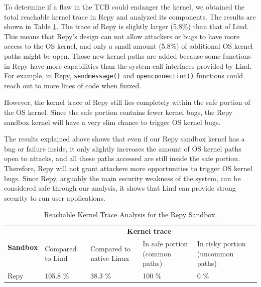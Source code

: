 To determine if a flaw in the TCB could endanger the kernel,
we obtained the total reachable kernel trace in Repy and analyzed its
components.
The results are shown in Table \ref{table:trace-Repy}. The trace of Repy is
slightly larger (5.8\%) than that of Lind.
This means that Repy's design can not allow attackers or bugs to
have more access to the OS kernel, and only a small amount (5.8\%) of
additional OS kernel paths might be open.
Those new kernel paths are added because some functions in Repy
have more capabilities than the system call interfaces
provided by Lind. For example, in Repy,
\texttt{sendmessage()} and \texttt{openconnection()}
functions could reach out to more lines of code when fuzzed.

However, the kernel trace of Repy still lies completely within the safe
portion of the OS kernel.
Since the safe portion contains fewer kernel bugs, the Repy sandbox kernel
will have a very slim chance to trigger OS kernel bugs.

The results explained above shows that even if our Repy sandbox kernel has a
bug or failure inside,
it only slightly increases the amount of OS kernel paths open to attacks,
and all these paths accessed are still inside the safe portion.
Therefore, Repy will not grant attackers more opportunities to trigger OS
kernel bugs.
Since Repy, arguably the main security weakness of the system, can be
considered safe through our analysis,
it shows that Lind can provide strong security to run user applications.

\begin{table}
\centering
\scriptsize
\caption{Reachable Kernel Trace Analysis for the Repy Sandbox. }
\begin{tabular}{|l|l|l|l|l|}
  \hline
  \multirow{3}{.8cm}{\bf Sandbox} & \multicolumn{4}{c|}{\bf Kernel trace} \\ \cline{2-5}
  & \multirow{2}{1cm}{Compared to Lind} &
  \multirow{2}{1.3cm}{Compared to native Linux} & \multirow{2}{1.7cm}{In safe portion
  (common paths)} & \multirow{2}{1.9cm}{In risky portion (uncommon paths)} \\
  & & & & \\  \hline

  Repy & 105.8 \% & 38.3 \% & 100 \%  & 0 \%  \\
  \hline
\end{tabular}
\label{table:trace-Repy}
\end{table}


